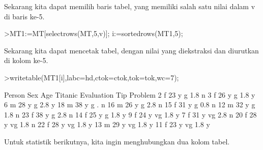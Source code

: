 \documentclass[a4paper,10pt]{article}
\begin{document}
\begin{eulernotebook}
\begin{eulercomment}
\begin{eulercomment}
\begin{eulercomment}
\begin{eulercomment}
\begin{eulercomment}
\begin{eulercomment}
\begin{eulercomment}
\begin{eulercomment}
\begin{eulercomment}
\begin{eulercomment}
\begin{eulercomment}
\begin{eulercomment}
\begin{eulercomment}
\begin{eulercomment}
\begin{eulercomment}
\begin{eulercomment}
\begin{eulercomment}
\begin{eulercomment}
\begin{eulercomment}
\begin{eulercomment}
\begin{eulercomment}
\begin{eulercomment}
\begin{eulercomment}
\begin{eulercomment}
\begin{eulercomment}
\begin{eulercomment}
\begin{eulercomment}
\begin{eulercomment}
\begin{eulercomment}
\begin{eulercomment}
\begin{eulercomment}
\begin{eulercomment}
\begin{euleroutput}
\end{euleroutput}
\begin{eulercomment}
Sekarang kita dapat memilih baris tabel, yang memiliki salah satu
nilai dalam v di baris ke-5.
\end{eulercomment}
\begin{eulerprompt}
>MT1:=MT[selectrows(MT,5,v)]; i:=sortedrows(MT1,5);
\end{eulerprompt}
\begin{eulercomment}
Sekarang kita dapat mencetak tabel, dengan nilai yang diekstraksi dan
diurutkan di kolom ke-5.
\end{eulercomment}
\begin{eulerprompt}
>writetable(MT1[i],labc=hd,ctok=ctok,tok=tok,wc=7);
\end{eulerprompt}
\begin{euleroutput}
   Person    Sex    Age Titanic Evaluation    Tip Problem
        2      f     23       y          g    1.8       n
        3      f     26       y          g    1.8       y
        6      m     28       y          g    2.8       y
       18      m     38       y          g      .       n
       16      m     26       y          g    2.8       n
       15      f     31       y          g    0.8       n
       12      m     32       y          g    1.8       n
       23      f     38       y          g    2.8       n
       14      f     25       y          g    1.8       y
        9      f     24       y         vg    1.8       y
        7      f     31       y         vg    2.8       n
       20      f     28       y         vg    1.8       n
       22      f     28       y         vg    1.8       y
       13      m     29       y         vg    1.8       y
       11      f     23       y         vg    1.8       y
\end{euleroutput}
\begin{eulercomment}
Untuk statistik berikutnya, kita ingin menghubungkan dua kolom tabel.

\end{eulercomment}
\end{eulercomment}
\end{eulercomment}
\end{eulercomment}
\end{eulercomment}
\end{eulercomment}
\end{eulercomment}
\end{eulercomment}
\end{eulercomment}
\end{eulercomment}
\end{eulercomment}
\end{eulercomment}
\end{eulercomment}
\end{eulercomment}
\end{eulercomment}
\end{eulercomment}
\end{eulercomment}
\end{eulercomment}
\end{eulercomment}
\end{eulercomment}
\end{eulercomment}
\end{eulercomment}
\end{eulercomment}
\end{eulercomment}
\end{eulercomment}
\end{eulercomment}
\end{eulercomment}
\end{eulercomment}
\end{eulercomment}
\end{eulercomment}
\end{eulercomment}
\end{eulercomment}
\end{eulercomment}
\end{eulernotebook}
\end{document}
